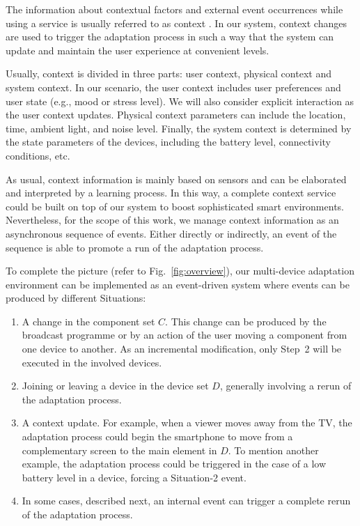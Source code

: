 The information about contextual factors and external event occurrences while using a service is usually referred to as context \cite{hussain2018model}. 
In our system, context changes are used to trigger the adaptation process in such a way that the system can update and maintain the user experience at convenient levels. 

Usually, context is divided in three parts: user context, physical context and system context. 
In our scenario, the user context includes user preferences and user state (e.g., mood or stress level). 
We will also consider explicit interaction as the user context updates. 
Physical context parameters can include the location, time, ambient light, and noise level. 
Finally, the system context is determined by the state parameters of the devices, including the battery level, connectivity conditions, etc. 

As usual, context information is mainly based on sensors and can be elaborated and interpreted by a learning process. 
In this way, a complete context service could be built on top of our system to boost sophisticated smart environments. 
Nevertheless, for the scope of this work, we manage context information as an asynchronous sequence of events.
Either directly or indirectly, an event of the sequence is able to promote a run of the adaptation process.

To complete the picture (refer to Fig.~\ref{fig:overview}), our multi-device adaptation environment can be implemented as an event-driven system where events can be produced by different Situations:

\begin{enumerate}
	\item A change in the component set $C$. This change can be produced by the broadcast programme or by an action of the user moving a component from one device to another. As an incremental modification, only Step~2 will be executed in the involved devices.
	\item Joining or leaving a device in the device set $D$, generally involving a rerun of the adaptation process. 
	\item A context update. For example, when a viewer moves away from the TV, the adaptation process could begin the smartphone to move from a complementary screen to the main element in $D$. To mention another example, the adaptation process could be triggered in the case of a low battery level in a device, forcing a Situation-2 event.
	\item In some cases, described next, an internal event can trigger a complete rerun of the adaptation process. 
\end{enumerate}


